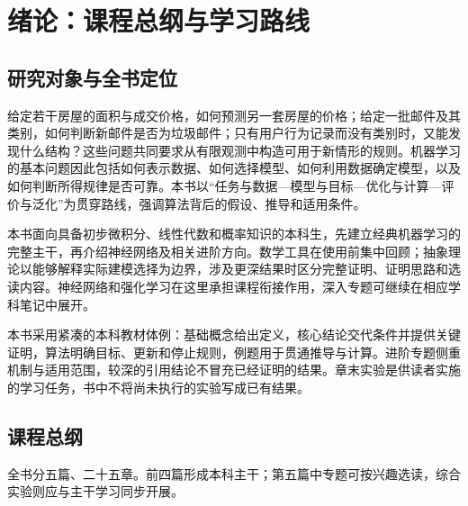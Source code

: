 \chapter*{绪论：课程总纲与学习路线}

\section*{研究对象与全书定位}

给定若干房屋的面积与成交价格，如何预测另一套房屋的价格；给定一批邮件及其类别，如何判断新邮件是否为垃圾邮件；只有用户行为记录而没有类别时，又能发现什么结构？这些问题共同要求从有限观测中构造可用于新情形的规则。机器学习的基本问题因此包括如何表示数据、如何选择模型、如何利用数据确定模型，以及如何判断所得规律是否可靠。本书以“任务与数据---模型与目标---优化与计算---评价与泛化”为贯穿路线，强调算法背后的假设、推导和适用条件。

本书面向具备初步微积分、线性代数和概率知识的本科生，先建立经典机器学习的完整主干，再介绍神经网络及相关进阶方向。数学工具在使用前集中回顾；抽象理论以能够解释实际建模选择为边界，涉及更深结果时区分完整证明、证明思路和选读内容。神经网络和强化学习在这里承担课程衔接作用，深入专题可继续在相应学科笔记中展开。

本书采用紧凑的本科教材体例：基础概念给出定义，核心结论交代条件并提供关键证明，算法明确目标、更新和停止规则，例题用于贯通推导与计算。进阶专题侧重机制与适用范围，较深的引用结论不冒充已经证明的结果。章末实验是供读者实施的学习任务，书中不将尚未执行的实验写成已有结果。

\section*{课程总纲}

全书分五篇、二十五章。前四篇形成本科主干；第五篇中专题可按兴趣选读，综合实验则应与主干学习同步开展。

